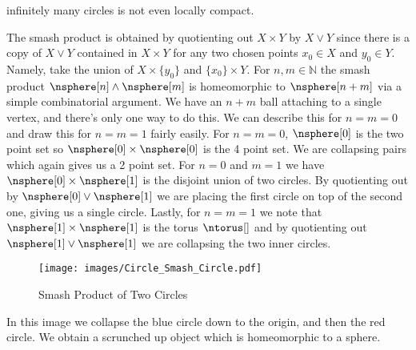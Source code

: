 \documentclass{book}                                                           %
\begin{document}
                infinitely many circles is not even locally compact.
                \par\hfill\par
                The smash product is obtained by quotienting out $X\times{Y}$ by
                $X\lor{Y}$ since there is a copy of $X\lor{Y}$ contained in
                $X\times{Y}$ for any two chosen points $x_{0}\in{X}$ and
                $y_{0}\in{Y}$. Namely, take the union of $X\times\{y_{0}\}$ and
                $\{x_{0}\}\times{Y}$. For $n,m\in\mathbb{N}$ the smash product
                $\nsphere[n]\land\nsphere[m]$ is homeomorphic to $\nsphere[n+m]$
                via a simple combinatorial argument. We have an $n+m$ ball
                attaching to a single vertex, and there's only one way to do
                this. We can describe this for $n=m=0$ and draw this for
                $n=m=1$ fairly easily. For $n=m=0$, $\nsphere[0]$ is the two
                point set so $\nsphere[0]\times\nsphere[0]$ is the 4 point set.
                We are collapsing pairs which again gives us a 2 point set. For
                $n=0$ and $m=1$ we have $\nsphere[0]\times\nsphere[1]$ is the
                disjoint union of two circles. By quotienting out by
                $\nsphere[0]\lor\nsphere[1]$ we are placing the first circle on
                top of the second one, giving us a single circle. Lastly, for
                $n=m=1$ we note that $\nsphere[1]\times\nsphere[1]$ is the torus
                $\ntorus[]$ and by quotienting out $\nsphere[1]\lor\nsphere[1]$
                we are collapsing the two inner circles.
                \begin{figure}[H]
                    \centering
                    \captionsetup{type=figure}
                    \texttt{[image: images/Circle\_Smash\_Circle.pdf]}
                    \caption{Smash Product of Two Circles}
                    \label{fig:S2_Smash_S2}
                \end{figure}
                In this image we collapse the blue circle down to the origin,
                and then the red circle. We obtain a scrunched up object which
                is homeomorphic to a sphere.
\end{document}
